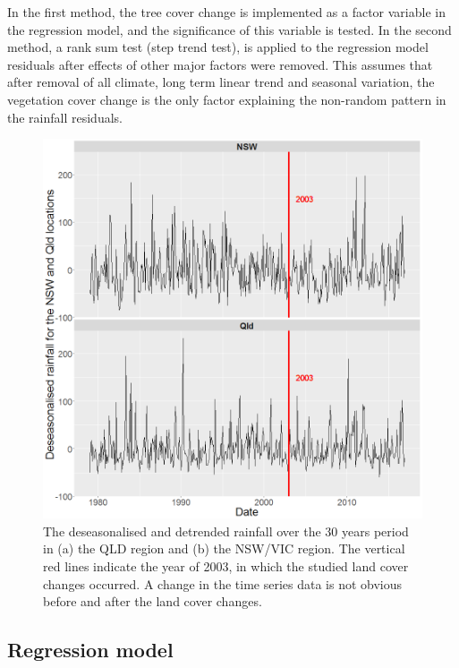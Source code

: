 \documentclass[fleqn,10pt,lineno]{wlpeerj} %
\theoremstyle{definition}
\theoremstyle{definition}
\theoremstyle{definition}
\theoremstyle{remark}
\begin{document}
In the first method, the tree cover change is implemented as a factor
variable in the regression model, and the significance of this variable
is tested. In the second method, a rank sum test (step trend test), is
applied to the regression model residuals after effects of other major
factors were removed. This assumes that after removal of all climate,
long term linear trend and seasonal variation, the vegetation cover
change is the only factor explaining the non-random pattern in the
rainfall residuals.

\begin{figure}
\includegraphics[width=0.9\linewidth]{figures/Rainfall_resid} \caption{The deseasonalised and detrended rainfall over the 30 years period in (a) the QLD region and (b) the NSW/VIC region. The vertical red lines indicate the year of 2003, in which the studied land cover changes occurred. A change in the time series data is not obvious before and after the land cover changes.}\label{fig:ts-mean}
\end{figure}

\subsection{Regression model}\label{reg_model}
\end{document}
